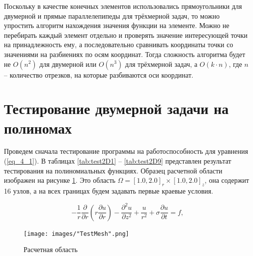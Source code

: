 Поскольку в качестве конечных элементов использовались прямоугольники для двумерной и прямые параллелепипеды для трёхмерной задач, то можно упростить алгоритм нахождения значения функции на элементе. Можно не перебирать каждый элемент отдельно и проверять значение интересующей точки на принадлежность ему, а последовательно сравнивать координаты точки со значениями на разбиениях по осям координат. Тогда сложность алгоритма будет не $O(n^2)$ для двумерной или $O(n^3)$ для трёхмерной задач, а $O(k \cdot n)$, где $n$ -- количество отрезков, на которые разбиваются оси координат.

\section{Тестирование двумерной задачи на полиномах}

Проведем сначала тестирование программы на работоспособность для уравнения (\ref{eq_4_1}). В таблицах \ref{tab:test2D1} -- \ref{tab:test2D9} представлен результат тестирования на полиномиальных функциях. Образец расчетной области изображен на рисунке \ref{fig:exampleOf3DMesh}. Это область $\Omega = [1.0, 2.0]_r \times [1.0, 2.0]_z$, она содержит 16 узлов, а на всех границах будем задавать первые краевые условия. 

\begin{equation} \label{eq_4_1}
	-\frac{1}{r} \frac{\partial}{\partial r} \left(r \frac{\partial u}{\partial r}\right) - \frac{\partial^2 u}{\partial z^2} + \frac{u}{r^2} + \sigma \frac{\partial u}{\partial t} = f,
\end{equation}

\begin{figure}
	\centering
	\vspace*{0.7cm}
	\texttt{[image: images/"TestMesh".png]}
	\caption{Расчетная область}
	\label{fig:exampleOf3DMesh}
\end{figure}

